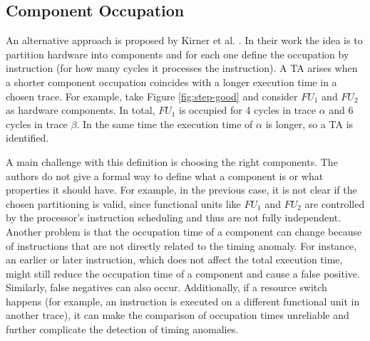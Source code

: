 \subsection{Component Occupation}

An alternative approach is proposed by Kirner et al. \cite{kirner_precise_2009}. In their work the idea is to partition hardware into components and for each one define the occupation by instruction (for how many cycles it processes the instruction). A TA arises when a shorter component occupation coincides with a longer execution time in a chosen trace. For example, take Figure \ref{fig:step-good} and consider $FU_1$ and $FU_2$ as hardware components. In total, $FU_1$ is occupied for 4 cycles in trace $\alpha$ and 6 cycles in trace $\beta$. In the same time the execution time of $\alpha$ is longer, so a TA is identified.

A main challenge with this definition is choosing the right components. The authors do not give a formal way to define what a component is or what properties it should have. For example, in the previous case, it is not clear if the chosen partitioning is valid, since functional units like $FU_1$ and $FU_2$ are controlled by the processor's instruction scheduling and thus are not fully independent. Another problem is that the occupation time of a component can change because of instructions that are not directly related to the timing anomaly. For instance, an earlier or later instruction, which does not affect the total execution time, might still reduce the occupation time of a component and cause a false positive. Similarly, false negatives can also occur. Additionally, if a resource switch happens (for example, an instruction is executed on a different functional unit in another trace), it can make the comparison of occupation times unreliable and further complicate the detection of timing anomalies.







